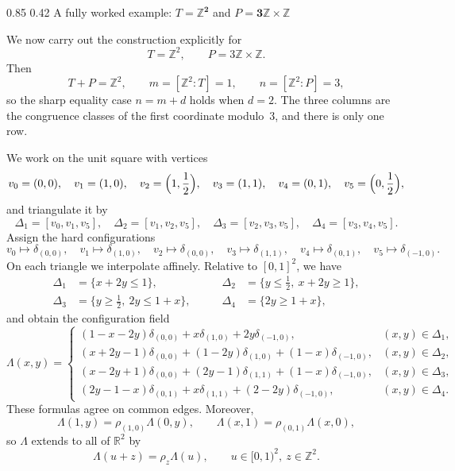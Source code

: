 \documentclass[11pt,reqno]{amsart}
\makeatletter
\numberwithin{equation}{section}
\renewcommand\subsection{\@startsection{subsection}{2}{\z@}%
  {0.85\baselineskip \@plus 0.25\baselineskip \@minus 0.10\baselineskip}%
  {0.42\baselineskip}%
  {\normalfont\bfseries}}
\theoremstyle{definition}
\theoremstyle{remark}
\newcommand{\R}{\mathbb R}
\newcommand{\Z}{\mathbb Z}
\makeatother
\begin{document}
\subsection{A fully worked example: $T=\boldsymbol{\Z^2}$ and $P=\boldsymbol{3\Z\times\Z}$}
\label{subsec:worked-example-Z2-3ZxZ}

We now carry out the construction explicitly for
\[
 T=\Z^2,
 \qquad
 P=3\Z\times\Z.
\]
Then
\[
 T+P=\Z^2,
 \qquad
 m=[\Z^2:T]=1,
 \qquad
 n=[\Z^2:P]=3,
\]
so the sharp equality case $n=m+d$ holds when $d=2$.
The three columns are the congruence classes of the first coordinate modulo~$3$,
and there is only one row.

We work on the unit square with vertices
\[
 v_0=(0,0),\quad v_1=(1,0),\quad v_2=\Bigl(1,\frac12\Bigr),\quad
 v_3=(1,1),\quad v_4=(0,1),\quad v_5=\Bigl(0,\frac12\Bigr),
\]
and triangulate it by
\[
 \Delta_1=[v_0,v_1,v_5],
 \quad
 \Delta_2=[v_1,v_2,v_5],
 \quad
 \Delta_3=[v_2,v_3,v_5],
 \quad
 \Delta_4=[v_3,v_4,v_5].
\]
Assign the hard configurations
\[
 v_0\mapsto\delta_{(0,0)},
 \quad
 v_1\mapsto\delta_{(1,0)},
 \quad
 v_2\mapsto\delta_{(0,0)},
 \quad
 v_3\mapsto\delta_{(1,1)},
 \quad
 v_4\mapsto\delta_{(0,1)},
 \quad
 v_5\mapsto\delta_{(-1,0)}.
\]
On each triangle we interpolate affinely.  Relative to $[0,1]^2$, we have
\[
 \begin{aligned}
 \Delta_1&=\{x+2y\le1\},
 &\qquad
 \Delta_2&=\{y\le\tfrac12,\ x+2y\ge1\},\\
 \Delta_3&=\{y\ge\tfrac12,\ 2y\le1+x\},
 &\qquad
 \Delta_4&=\{2y\ge1+x\},
 \end{aligned}
\]
and obtain the configuration field
\begin{equation}\label{eq:worked-example-Lambda}
 \Lambda(x,y)=
 \begin{cases}
  (1-x-2y)\delta_{(0,0)}+x\delta_{(1,0)}+2y\delta_{(-1,0)},
   &(x,y)\in\Delta_1,\\[1mm]
  (x+2y-1)\delta_{(0,0)}+(1-2y)\delta_{(1,0)}+(1-x)\delta_{(-1,0)},
   &(x,y)\in\Delta_2,\\[1mm]
  (x-2y+1)\delta_{(0,0)}+(2y-1)\delta_{(1,1)}+(1-x)\delta_{(-1,0)},
   &(x,y)\in\Delta_3,\\[1mm]
  (2y-1-x)\delta_{(0,1)}+x\delta_{(1,1)}+(2-2y)\delta_{(-1,0)},
   &(x,y)\in\Delta_4.
 \end{cases}
\end{equation}
These formulas agree on common edges.  Moreover,
\[
 \Lambda(1,y)=\rho_{(1,0)}\Lambda(0,y),
 \qquad
 \Lambda(x,1)=\rho_{(0,1)}\Lambda(x,0),
\]
so $\Lambda$ extends to all of $\R^2$ by
\[
 \Lambda(u+z)=\rho_z\Lambda(u),
 \qquad u\in[0,1)^2,\ z\in\Z^2.
\]
\end{document}
